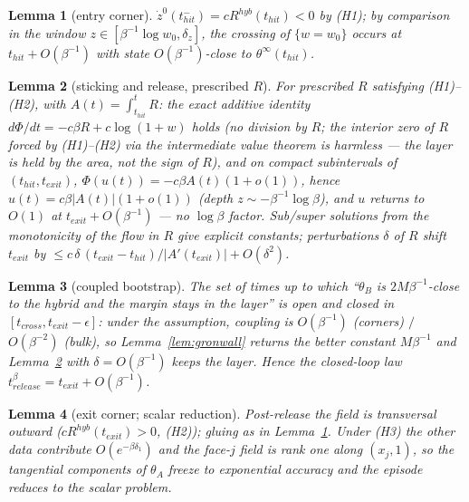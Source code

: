 \documentclass[11pt]{article}
\newtheorem{lemma}{Lemma}
\begin{document}
\begin{lemma}[entry corner]\label{lem:corner-in}
$\dot z^0(t_{hit}^-)=cR^{hyb}(t_{hit})<0$ by (H1); by comparison in the window
$z\in[\beta^{-1}\log w_0,\delta_z]$, the crossing of $\{w=w_0\}$ occurs at
$t_{hit}+O(\beta^{-1})$ with state $O(\beta^{-1})$-close to
$\theta^\infty(t_{hit})$.
\end{lemma}

\begin{lemma}[sticking and release, prescribed $R$]\label{lem:release}
For prescribed $R$ satisfying (H1)--(H2), with $A(t)=\int_{t_{hit}}^t R$: the
exact additive identity $d\Phi/dt=-c\beta R+c\log(1+w)$ holds (no division by
$R$; the interior zero of $R$ forced by (H1)--(H2) via the intermediate value
theorem is harmless --- the layer is held by the \emph{area}, not the sign of
$R$), and on compact subintervals of $(t_{hit},t_{exit})$,
$\Phi(u(t))=-c\beta A(t)(1+o(1))$, hence $u(t)=c\beta|A(t)|(1+o(1))$ (depth $z\sim-\beta^{-1}\log\beta$), and $u$
returns to $O(1)$ at $t_{exit}+O(\beta^{-1})$ --- no $\log\beta$ factor. Sub/super
solutions from the monotonicity of the flow in $R$ give explicit constants;
perturbations $\delta$ of $R$ shift $t_{exit}$ by
$\le c\,\delta\,(t_{exit}-t_{hit})/|A'(t_{exit})|+O(\delta^2)$.
\end{lemma}

\begin{lemma}[coupled bootstrap]\label{lem:bootstrap}
The set of times up to which ``$\theta_B$ is $2M\beta^{-1}$-close to the hybrid
and the margin stays in the layer'' is open and closed in
$[t_{cross},t_{exit}-\epsilon]$: under the assumption, coupling is
$O(\beta^{-1})$ (corners) $/$ $O(\beta^{-2})$ (bulk), so
Lemma~\ref{lem:gronwall} returns the better constant $M\beta^{-1}$ and
Lemma~\ref{lem:release} with $\delta=O(\beta^{-1})$ keeps the layer. Hence the
closed-loop law $t^\beta_{release}=t_{exit}+O(\beta^{-1})$.
\end{lemma}

\begin{lemma}[exit corner; scalar reduction]\label{lem:corner-out}
Post-release the field is transversal outward ($cR^{hyb}(t_{exit})>0$, (H2));
gluing as in Lemma~\ref{lem:corner-in}. Under (H3) the other data contribute
$O(e^{-\beta\delta_1})$ and the face-$j$ field is rank one along $(x_j,1)$, so
the tangential components of $\theta_A$ freeze to exponential accuracy and the
episode reduces to the scalar problem.
\end{lemma}
\end{document}

